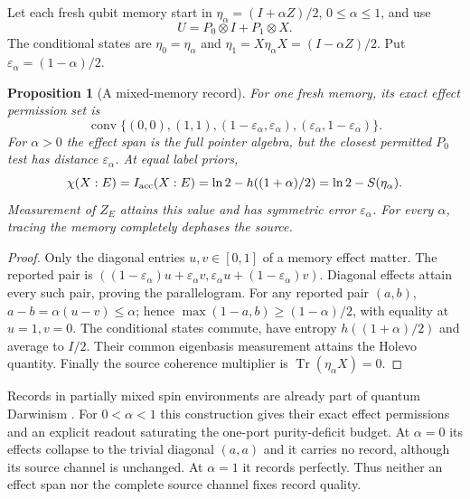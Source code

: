 \documentclass[12pt,a4paper]{article}
\newtheorem{proposition}[theorem]{Proposition}
\begin{document}
Let each fresh qubit memory start in
$\eta_\alpha=(I+\alpha Z)/2$, $0\le\alpha\le1$, and use
\[
 U=P_0\otimes I+P_1\otimes X .
\]
The conditional states are
$\eta_0=\eta_\alpha$ and
$\eta_1=X\eta_\alpha X=(I-\alpha Z)/2$.
Put $\varepsilon_\alpha=(1-\alpha)/2$.

\begin{proposition}[A mixed-memory record]
\label{prop:mixed-records}
For one fresh memory, its exact effect permission set is
\begin{equation}\label{eq:mixed-permission}
 \operatorname{conv}\{(0,0),(1,1),
       (1-\varepsilon_\alpha,\varepsilon_\alpha),
       (\varepsilon_\alpha,1-\varepsilon_\alpha)\}.
\end{equation}
For $\alpha>0$ the effect span is the full pointer algebra, but the
closest permitted $P_0$ test has distance $\varepsilon_\alpha$.
At equal label priors,
\begin{equation}\label{eq:mixed-information}
 \chi(X:E)=I_{\rm acc}(X:E)
 =\ln2-h((1+\alpha)/2)
 =\ln2-S(\eta_\alpha).
\end{equation}
Measurement of $Z_E$ attains this value and has symmetric error
$\varepsilon_\alpha$. For every $\alpha$, tracing the memory
completely dephases the source.
\end{proposition}
\begin{proof}
Only the diagonal entries $u,v\in[0,1]$ of a memory effect matter.
The reported pair is
$((1-\varepsilon_\alpha)u+\varepsilon_\alpha v,
\varepsilon_\alpha u+(1-\varepsilon_\alpha)v)$.
Diagonal effects attain every such pair, proving the parallelogram.
For any reported pair $(a,b)$,
$a-b=\alpha(u-v)\le\alpha$; hence
$\max(1-a,b)\ge(1-\alpha)/2$, with equality at $u=1,v=0$.
The conditional states commute, have entropy
$h((1+\alpha)/2)$ and average to $I/2$.
Their common eigenbasis measurement attains the Holevo quantity.
Finally the source coherence multiplier is
$\operatorname{Tr}(\eta_\alpha X)=0$.
\end{proof}

Records in partially mixed spin environments are already part of
quantum Darwinism \cite{ZwolakRiedelZurek2016}. For $0<\alpha<1$
this construction gives their exact effect permissions and an
explicit readout saturating the one-port purity-deficit budget.
At $\alpha=0$ its effects collapse to the trivial diagonal
$(a,a)$ and it carries no record, although its source channel is
unchanged. At $\alpha=1$ it records perfectly. Thus neither an
effect span nor the complete source channel fixes record quality.
\end{document}
